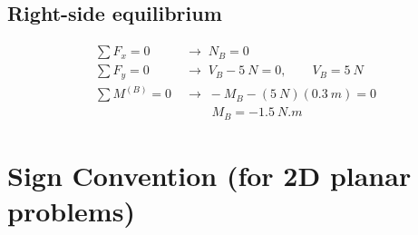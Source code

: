 \documentclass[11pt]{article}
\begin{document}
\subsection*{Right-side equilibrium}
\begin{align*}
  \textstyle\sum F_x = 0 &\;\rightarrow\; \boxed{N_B = 0} \\
  \textstyle\sum F_y = 0 &\;\rightarrow\; V_B - \SI{5}{N} = 0, \qquad \boxed{V_B = \SI{5}{N}} \\
  \textstyle\sum M^{(B)} = 0 &\;\rightarrow\; -M_B - (\SI{5}{N})(\SI{0.3}{m}) = 0 \\
  &\;\phantom{\rightarrow}\;\; \boxed{M_B = -\SI{1.5}{N.m}}
\end{align*}

\begin{center}
\end{center}

\section*{Sign Convention (for 2D planar problems)}
\end{document}
